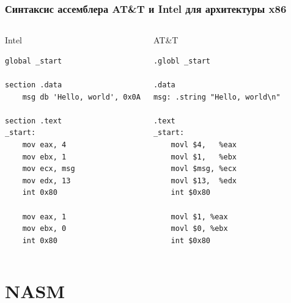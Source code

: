 \documentclass{beamer}
\begin{document}
    \begin{frame}[fragile]
        \frametitle{Синтаксис ассемблера AT\&T и Intel для архитектуры x86}
        \begin{columns}
            \begin{block}{Intel}\footnotesize
            \begin{verbatim}
global _start 

section .data
    msg db 'Hello, world', 0x0A

section .text
_start:
    mov eax, 4
    mov ebx, 1
    mov ecx, msg
    mov edx, 13
    int 0x80
    
    mov eax, 1
    mov ebx, 0
    int 0x80
            \end{verbatim}
            \end{block}
            \begin{block}{AT\&T}\footnotesize
            \begin{verbatim}
.globl _start

.data
msg: .string "Hello, world\n"

.text
_start:
    movl $4,   %eax
    movl $1,   %ebx
    movl $msg, %ecx
    movl $13,  %edx
    int $0x80

    movl $1, %eax
    movl $0, %ebx
    int $0x80
            \end{verbatim}
            \end{block}
        \end{columns}    
\end{frame}
    \section{NASM}
\end{document}
